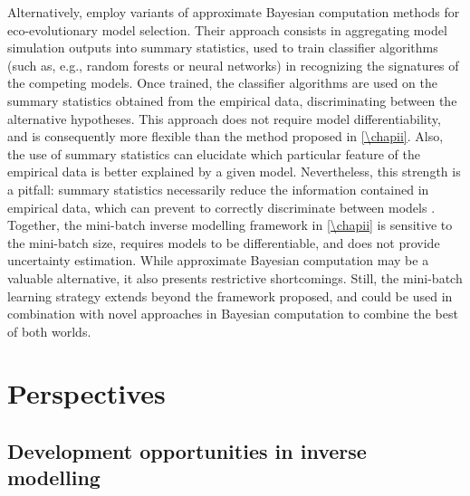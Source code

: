 % 
Alternatively, \cite{Sukumaran2016,Skeels2019,Skeels2022} employ variants of approximate Bayesian computation methods \citep{Csillery2010} for eco-evolutionary model selection. Their approach consists in aggregating model simulation outputs into summary statistics, used to train classifier algorithms (such as, e.g., random forests or neural networks) in recognizing the signatures of the competing models. Once trained, the classifier algorithms are used on the summary statistics obtained from the empirical data, discriminating between the alternative hypotheses. 
% 
This approach does not require model differentiability, and is consequently more flexible than the method proposed in \cref{\chapii}. Also, the use of summary statistics can elucidate which particular feature of the empirical data is better explained by a given model. 
% 
Nevertheless, this strength is a pitfall: summary statistics necessarily reduce the information contained in empirical data, which can prevent to correctly discriminate between models \citep{Csillery2010}.
% 
Together, the mini-batch inverse modelling framework in \cref{\chapii} is sensitive to the mini-batch size, requires models to be differentiable, and does not provide uncertainty estimation. While approximate Bayesian computation may be a valuable alternative, it also presents restrictive shortcomings. Still, the mini-batch learning strategy extends beyond the framework proposed, and could be used in combination with novel approaches in Bayesian computation to combine the best of both worlds.

\section{Perspectives}

\subsection{Development opportunities in inverse modelling}

